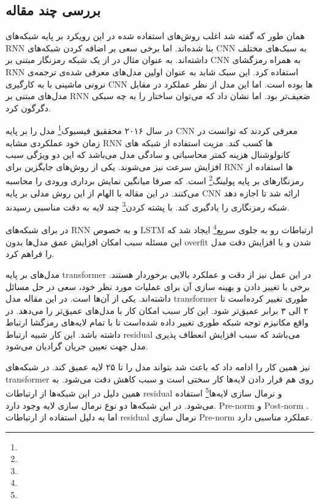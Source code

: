 \documentclass[12pt, a4paper, oneside]{report}
\begin{document}
\subsection{بررسی چند مقاله}

همان طور که گفته شد اغلب روش‌های استفاده شده در این رویکرد بر پایه شبکه‌های
RNN
بنا شده‌اند. اما برخی سعی بر اضافه کردن شبکه‌های
CNN
به سبک‌های مختلف داشته‌اند. به عنوان مثال در
\cite{kalchbrenner2013recurrent}
از یک شبکه رمزنگار مبتنی بر
CNN
به همراه رمزگشای
RNN
استفاده کرد. این سبک شابد به عنوان اولین مدل‌های معرفی شده‌ی ترجمه‌ی نرونی ماشینی با به کارگیری
CNN
ها بوده است. اما این مدل از نظر عملکرد در مقابل مدل‌های مبتنی بر
RNN
ضعیف‌تر بود. اما نشان داد که می‌توان ساختار را به چه سبکی دگرگون کرد.

در سال ۲۰۱۶ محققیق
فیسبوک\footnote{}
مدل
\cite{gehring2017convolutional}
را بر پایه
CNN
معرفی کردند که توانست در زمان خود عملکردی مشابه
RNN
ها کسب کند. مزیت استفاده از شبکه های کانولوشنال هزینه کمتر محاسباتی و سادگی مدل می‌باشد که این دو
ویژگی سبب افزایش سرعت نیز می‌شوند. یکی از روش‌های جایگزین برای
RNN
ها استفاده از
رمزنگار‌های بر پایه پولینگ\footnote{}
است. که صرفا میانگین نمایش برداری ورودی را محاسبه می‌کنند. در این مقاله با الهام از این روش
مدلی بر پایه
CNN
ارائه شد تا اجازه دهد شبکه رمزنگاری را یادگیری کند. با
پشته کردن\footnote{}
چند لایه به دقت مناسبی رسیدند.

در
\cite{zhou2016deep}
برای شبکه‌های
RNN
و به خصوص
LSTM
ارتباطات رو به جلوی سریع\footnote{}
ایجاد شد که این مسئله سبب امکان افزایش عمق مدل‌ها بدون
overfit
شدن و با افزایش دقت مدل را فراهم کرد.

مدل‌های بر پایه
transformer
در این عمل نیز از دقت و عملکرد بالایی برخوردار هستند. برخی با تغییر دادن و بهینه سازی آن برای
عملیات مورد نظر خود، سعی در حل مسائل داشته‌اند.
\cite{bapna2018training}
یکی از آن‌ها است. در این مقاله مدل
transformer
طوری تغییر کرده‌است تا ۲ الی ۳ برابر عمیق‌تر شود. این کار سبب امکان کار با مدل‌های عمیق‌تر را می‌دهد.
در واقع مکانیزم توجه شبکه طوری تغییر داده شده‌است تا با تمام لایه‌های رمزگشا ارتباط داشته باشد. این کار شبیه
ارتباط
residual
می‌باشد که سبب افزایش انعطاف پذیری مدل جهت تعیین جریان گرادیان می‌شود.

\cite{wang2019learning}
نیز همین کار را ادامه داد که باعث شد بتواند مدل را تا ۲۵ لایه عمیق کند.  
در شبکه‌های
transformer
روی هم قرار دادن لایه‌ها کار سختی است و سبب کاهش دقت می‌شود. به همین دلیل در این شبکه‌ها
از ارتباطات
residual
و نرمال سازی لایه‌ها\footnote{}
استفاده می‌شود. در این شبکه‌ها دو نوع نرمال سازی لایه وجود دارد.
Pre-norm
و
Post-norm
. اما به دلیل استفاده از ارتباطات
residual
نرمال سازی
Pre-norm
عملکرد مناسبی دارد.
\end{document}
